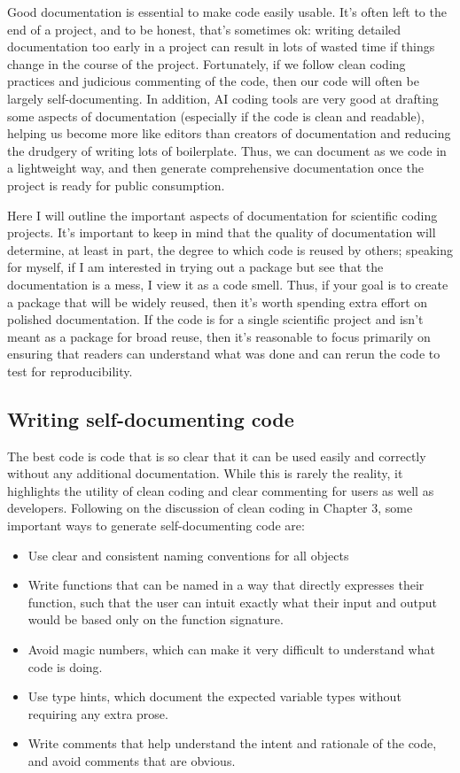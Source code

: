 Good documentation is essential to make code easily usable.  It's often left to the end of a project, and to be honest, that's sometimes ok: writing detailed documentation too early in a project can result in lots of wasted time if things change in the course of the project.  Fortunately, if we follow clean coding practices and judicious commenting of the code, then our code will often be largely self-documenting.  In addition, AI coding tools are very good at drafting some aspects of documentation (especially if the code is clean and readable), helping us become more like editors than creators of documentation and reducing the drudgery of writing lots of boilerplate.  Thus, we can document as we code in a lightweight way, and then generate comprehensive documentation once the project is ready for public consumption.

Here I will outline the important aspects of documentation for scientific coding projects.  It's important to keep in mind that the quality of documentation will determine, at least in part, the degree to which code is reused by others; speaking for myself, if I am interested in trying out a package but see that the documentation is a mess, I view it as a code smell.  Thus, if your goal is to create a package that will be widely reused, then it's worth spending extra effort on polished documentation.  If the code is for a single scientific project and isn't meant as a package for broad reuse, then it's reasonable to focus primarily on ensuring that readers can understand what was done and can rerun the code to test for reproducibility.

\subsection{Writing self-documenting code}

The best code is code that is so clear that it can be used easily and correctly without any additional documentation.  While this is rarely the reality, it highlights the utility of clean coding and clear commenting for users as well as developers.  Following on the discussion of clean coding in Chapter 3, some important ways to generate self-documenting code are:

\begin{itemize}
\item Use clear and consistent naming conventions for all objects
\item Write functions that can be named in a way that directly expresses their function, such that the user can intuit exactly what their input and output would be based only on the function signature.
\item Avoid magic numbers, which can make it very difficult to understand what code is doing.
\item Use type hints, which document the expected variable types without requiring any extra prose.
\item Write comments that help understand the intent and rationale of the code, and avoid comments that are obvious.
\end{itemize}

